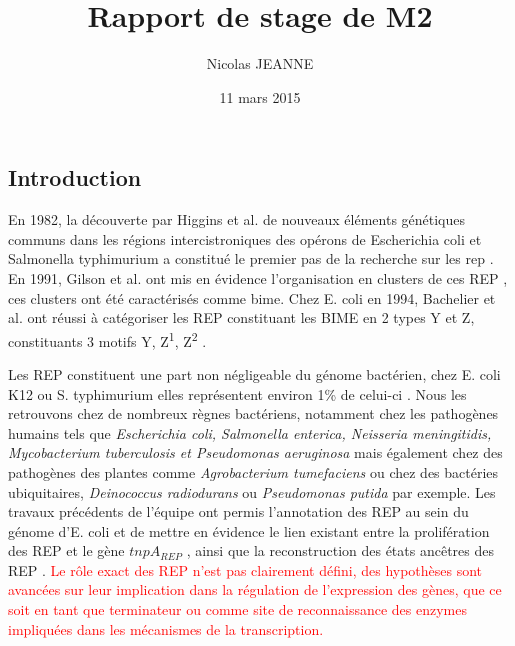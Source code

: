 \documentclass[12pt,a4paper]{report}
\author{Nicolas JEANNE}
\title{Rapport de stage de M2}
\date{11 mars 2015}
\begin{document}
\maketitle

\begin{onehalfspace}
\chapter*{Introduction}
En 1982, la découverte par Higgins et al. de nouveaux éléments génétiques communs dans les régions intercistroniques des opérons de Escherichia coli et Salmonella typhimurium a constitué le premier pas de la recherche sur les \gls{rep} \citep{Higgins1982}. En 1991, Gilson et al. ont mis en évidence l'organisation en clusters de ces REP \citep{Gilson1991}, ces clusters ont été caractérisés comme \gls{bime}. Chez E. coli en 1994, Bachelier et al. ont réussi à catégoriser les REP constituant les BIME en 2 types Y et Z, constituants 3 motifs Y, Z\textsuperscript{1}, Z\textsuperscript{2}  \citep{Bachellier1994}.
 
Les REP constituent une part non négligeable du génome bactérien, chez E. coli K12 ou S. typhimurium elles représentent environ 1\% de celui-ci \citep{Gilson1991}. Nous les retrouvons chez de nombreux règnes bactériens, notamment chez les pathogènes humains tels que \textit{Escherichia coli, Salmonella enterica, Neisseria meningitidis, Mycobacterium tuberculosis et Pseudomonas aeruginosa} mais également chez des pathogènes des plantes comme \textit{Agrobacterium tumefaciens} ou chez des bactéries ubiquitaires, \textit{Deinococcus radiodurans} ou \textit{Pseudomonas putida} par exemple. Les travaux précédents de l'équipe ont permis l'annotation des REP au sein du génome d'E. coli et de mettre en évidence le lien existant entre la prolifération des REP et le gène $tnpA_{REP}$ \citep{Weyder2013,Bosc2014}, ainsi que la reconstruction des états ancêtres des REP \citep{Bosc2014}.  \textcolor{red}{Le rôle exact des REP n'est pas clairement défini, des hypothèses sont avancées sur leur implication dans la régulation de l'expression des gènes, que ce soit en tant que terminateur ou comme site de reconnaissance des enzymes impliquées dans les mécanismes de la transcription.}


\end{onehalfspace}
\end{document}
